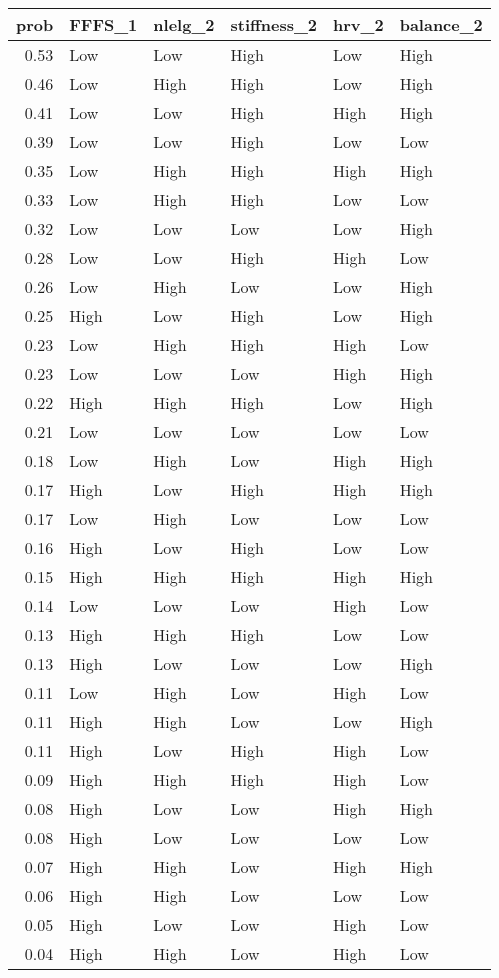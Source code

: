 \documentclass[
]{article}
\begin{document}
\begin{table}[H]

\caption{\label{tab:unnamed-chunk-6}}
\centering
\begin{tabular}[t]{r|l|l|l|l|l}
\hline
prob & FFFS\_1 & nlelg\_2 & stiffness\_2 & hrv\_2 & balance\_2\\
\hline
0.53 & Low & Low & High & Low & High\\
\hline
0.46 & Low & High & High & Low & High\\
\hline
0.41 & Low & Low & High & High & High\\
\hline
0.39 & Low & Low & High & Low & Low\\
\hline
0.35 & Low & High & High & High & High\\
\hline
0.33 & Low & High & High & Low & Low\\
\hline
0.32 & Low & Low & Low & Low & High\\
\hline
0.28 & Low & Low & High & High & Low\\
\hline
0.26 & Low & High & Low & Low & High\\
\hline
0.25 & High & Low & High & Low & High\\
\hline
0.23 & Low & High & High & High & Low\\
\hline
0.23 & Low & Low & Low & High & High\\
\hline
0.22 & High & High & High & Low & High\\
\hline
0.21 & Low & Low & Low & Low & Low\\
\hline
0.18 & Low & High & Low & High & High\\
\hline
0.17 & High & Low & High & High & High\\
\hline
0.17 & Low & High & Low & Low & Low\\
\hline
0.16 & High & Low & High & Low & Low\\
\hline
0.15 & High & High & High & High & High\\
\hline
0.14 & Low & Low & Low & High & Low\\
\hline
0.13 & High & High & High & Low & Low\\
\hline
0.13 & High & Low & Low & Low & High\\
\hline
0.11 & Low & High & Low & High & Low\\
\hline
0.11 & High & High & Low & Low & High\\
\hline
0.11 & High & Low & High & High & Low\\
\hline
0.09 & High & High & High & High & Low\\
\hline
0.08 & High & Low & Low & High & High\\
\hline
0.08 & High & Low & Low & Low & Low\\
\hline
0.07 & High & High & Low & High & High\\
\hline
0.06 & High & High & Low & Low & Low\\
\hline
0.05 & High & Low & Low & High & Low\\
\hline
0.04 & High & High & Low & High & Low\\
\hline
\end{tabular}
\end{table}
\end{document}
